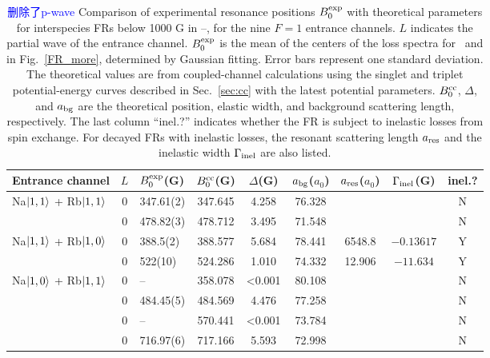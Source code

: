 \begin{sidewaystable}[thp]
\caption[Summary table of Na-Rb Feshbach resonances with different spin combinations]{\textcolor{blue}{删除了p-wave} Comparison of experimental resonance positions $B_0^{\rm exp}$ with theoretical parameters for interspecies FRs below 1000 G in \Na--\Rb, for the nine $F = 1$ entrance channels. $L$ indicates the partial wave of the entrance channel. $B_0^{\rm exp}$ is the mean of the centers of the loss spectra for \Na\ and \Rb in Fig.~\ref{FR_more}, determined by Gaussian fitting. Error bars represent one standard deviation. The theoretical values are from coupled-channel calculations using the singlet and triplet potential-energy curves described in Sec.~\ref{sec:cc} with the latest potential parameters. $B_0^{\rm cc}$, $\Delta$, and $a_{\rm bg}$ are the theoretical position, elastic width, and background scattering length, respectively. The last column ``inel.?'' indicates whether the FR is subject to inelastic losses from spin exchange. For decayed FRs with inelastic losses, the resonant scattering length $a_{\rm res}$ and the inelastic width $\Gamma_{\rm inel}$ are also listed.}
\label{fst}\centering
\begin{tabular}{l|c|l|c|c|c|c|c|c}
\hline\hline
Entrance channel 				& $L$ & $B_0^{\rm exp}$(G)	& $B_0^{\rm cc}$(G)	& $\Delta$(G)	& $a_{\rm bg}$($a_0$) & $a_{\rm res}$($a_0$) & $\Gamma_{\rm inel}$(G)	& inel.? \\
\hline
Na$\ket{1,1}$ + Rb$\ket{1,1}$   & 0    	& 347.61(2)       	& 347.645 			& 4.258  			 & 76.328  	& & & N     \\
					        	& 0 	& 478.82(3)        	& 478.712 			& 3.495  			 & 71.548   & & & N     \\ \hline
Na$\ket{1,1}$ + Rb$\ket{1,0}$   & 0    	& 388.5(2)          & 388.577 			& 5.684  & 78.441                 &6548.8 & $-0.13617$& Y     \\
								& 0    	& 522(10)           & 524.286 			& 1.010  & 74.332                 & 12.906& $-11.634$& Y     \\ \hline
Na$\ket{1,0}$ + Rb$\ket{1,1}$   & 0   	&  	--		        & 358.078 			& <0.001  & 80.108                & & & N     \\
								& 0   	& 484.45(5)         & 484.569 			& 4.476  & 77.258                 & & & N     \\
								& 0		& 	--				& 570.441			& <0.001	& 73.784			 & & & N \\
								& 0   	& 716.97(6)         & 717.166 			& 5.593  & 72.998                 & & & N     \\  \hline

\end{tabular}
\end{sidewaystable}
